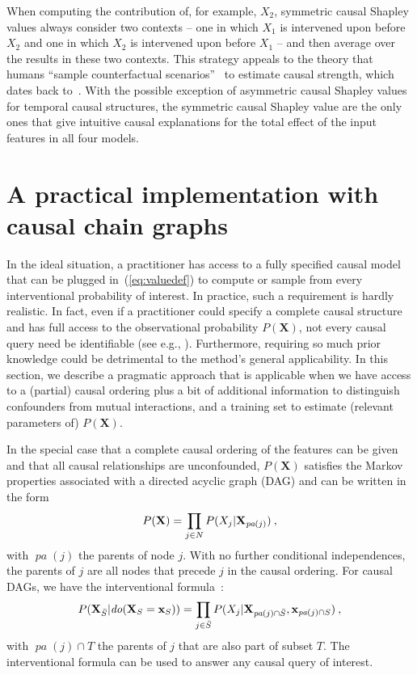 \documentclass{article}
\newcommand{\vX}{\mathbf{X}}
\newcommand{\vx}{\mathbf{x}}
\newcommand{\dodo}{\mathit{do}}
\newcommand{\lvdo}[1]{\dodo(\vX_{#1} = \vx_{#1})}
\newcommand{\pa}{\mathop{\textit{pa}}}
\newcommand{\spa}{\mathop{\textit{\scriptsize pa}}}
\newcommand{\allfeatures}{{N}}
\begin{document}
When computing the contribution of, for example, $X_2$, symmetric causal Shapley values always consider two contexts -- one in which $X_1$ is intervened upon before $X_2$ and one in which $X_2$ is intervened upon before $X_1$ -- and then average over the results in these two contexts. This strategy appeals to the theory that humans ``sample counterfactual scenarios''~\cite{icard2017normality} to estimate causal strength, which dates back to~\cite{lewis1974causation}. With the possible exception of asymmetric causal Shapley values for temporal causal structures, the symmetric causal Shapley value are the only ones that give intuitive causal explanations for the total effect of the input features in all four models.

\section{A practical implementation with causal chain graphs}

In the ideal situation, a practitioner has access to a fully specified causal model that can be plugged in~(\ref{eq:valuedef}) to compute or sample from every interventional probability of interest. In practice, such a requirement is hardly realistic. In fact, even if a practitioner could specify a complete causal structure and has full access to the observational probability $P(\vX)$, not every causal query need be identifiable (see e.g., \cite{pearl2012calculus}). Furthermore, requiring so much prior knowledge could be detrimental to the method's general applicability. In this section, we describe a pragmatic approach that is applicable when we have access to a (partial) causal ordering plus a bit of additional information to distinguish confounders from mutual interactions, and a training set to estimate (relevant parameters of) $P(\vX)$.

In the special case that a complete causal ordering of the features can be given and that all causal relationships are unconfounded, $P(\vX)$ satisfies the Markov properties associated with a directed acyclic graph (DAG) and can be written in the form
\[
P(\vX) = \prod_{j \in \allfeatures} P(X_j|\vX_{\spa(j)}) \: ,
\]
with $\pa(j)$ the parents of node $j$. With no further conditional independences, the parents of $j$ are all nodes that precede $j$ in the causal ordering. For causal DAGs, we have the interventional formula~\cite{lauritzen2002chain}:
\begin{equation}
P(\vX_{\bar{S}}|\lvdo{S}) = \prod_{j \in \bar{S}} P(X_j|\vX_{\spa(j)  \cap \bar{S}},\vx_{\spa(j) \cap S}) \: ,
\label{eq:interventional}
\end{equation}
with $\pa(j) \cap T$ the parents of $j$ that are also part of subset $T$. The interventional formula can be used to answer any causal query of interest.
\end{document}
